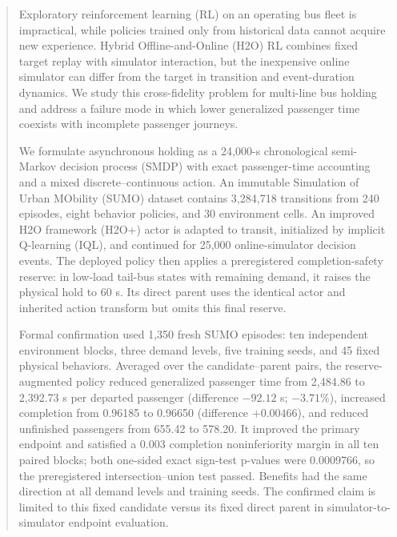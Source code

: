 \begin{abstract}
Exploratory reinforcement learning (RL) on an operating bus fleet is
impractical, while policies trained only from historical data cannot acquire
new experience. Hybrid Offline-and-Online (H2O) RL combines fixed target replay
with simulator interaction, but the inexpensive online simulator can differ
from the target in transition and event-duration dynamics. We study this
cross-fidelity problem for multi-line bus holding and address a failure mode in
which lower generalized passenger time coexists with incomplete passenger
journeys.

We formulate asynchronous holding as a 24,000-s chronological semi-Markov
decision process (SMDP) with exact passenger-time accounting and a mixed
discrete--continuous action. An immutable Simulation of Urban MObility (SUMO)
dataset contains 3,284,718 transitions from 240 episodes, eight behavior
policies, and 30 environment cells. An improved H2O framework (H2O+) actor is
adapted to transit, initialized by implicit Q-learning (IQL), and continued for
25,000 online-simulator decision
events. The deployed policy then applies a preregistered completion-safety
reserve: in low-load tail-bus states with remaining demand, it raises the
physical hold to 60 s. Its direct parent uses the identical actor and inherited
action transform but omits this final reserve.

Formal confirmation used 1,350 fresh SUMO episodes: ten independent
environment blocks, three demand levels, five training seeds, and 45 fixed
physical behaviors. Averaged over the candidate--parent pairs, the reserve-augmented policy
reduced generalized passenger time from 2,484.86 to 2,392.73 s per departed
passenger (difference $-92.12$ s; $-3.71\%$), increased completion from
0.96185 to 0.96650 (difference $+0.00466$), and reduced unfinished passengers
from 655.42 to 578.20. It improved the primary endpoint and satisfied a 0.003
completion noninferiority margin in all ten paired blocks; both one-sided exact
sign-test p-values were 0.0009766, so the preregistered intersection--union test
passed. Benefits had the same direction at all demand levels and training
seeds. The confirmed claim is limited to this fixed candidate versus its fixed
direct parent in simulator-to-simulator endpoint evaluation.
\end{abstract}
